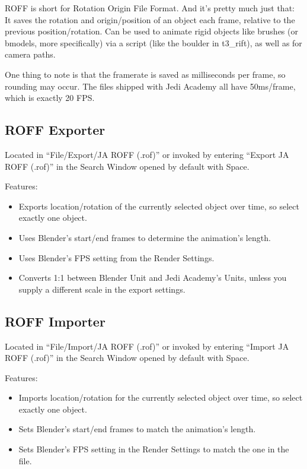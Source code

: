 \documentclass[a4paper,10pt]{article}
\begin{document}
 ROFF is short for Rotation Origin File Format. And it's pretty much just that: It saves the rotation and
 origin/position of an object each frame, relative to the previous position/rotation. Can be used to animate
 rigid objects like brushes (or bmodels, more specifically) via a script (like the boulder in t3\_rift), as
 well as for camera paths.
 
 One thing to note is that the framerate is saved as milliseconds per frame, so rounding may occur. The
 files shipped with Jedi Academy all have 50ms/frame, which is exactly 20 FPS.
 
 \subsection{ROFF Exporter}
 
 Located in ``File/Export/JA ROFF (.rof)'' or invoked by entering ``Export JA ROFF (.rof)'' in the Search Window
 opened by default with Space.
 
 Features:
 \begin{itemize}
  \item Exports location/rotation of the currently selected object over time, so select exactly one object.
  \item Uses Blender's start/end frames to determine the animation's length.
  \item Uses Blender's FPS setting from the Render Settings.
  \item Converts 1:1 between Blender Unit and Jedi Academy's Units, unless you supply a different scale in
  the export settings.
 \end{itemize}

 \subsection{ROFF Importer}
 
 Located in ``File/Import/JA ROFF (.rof)'' or invoked by entering ``Import JA ROFF (.rof)'' in the Search Window
 opened by default with Space.
 
 Features:
 \begin{itemize}
  \item Imports location/rotation for the currently selected object over time, so select exactly one object.
  \item Sets Blender's start/end frames to match the animation's length.
  \item Sets Blender's FPS setting in the Render Settings to match the one in the file.
 \end{itemize}
 
\end{document}
